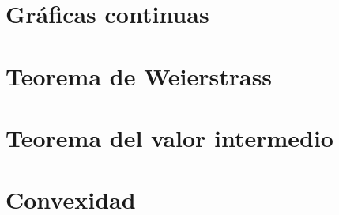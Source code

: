 \section{Gráficas continuas}

\section{Teorema de Weierstrass}

\section{Teorema del valor intermedio}

\section{Convexidad}

